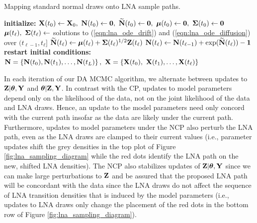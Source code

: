 \begin{algorithm}[htbp]
	\caption{Mapping standard normal draws onto LNA sample paths.}
	\label{alg:doLNA}
	\begin{algorithmic}[1]
		\State \textbf{initialize: }$ \bX(t_0) \gets \bX_0,\ \bN(t_0) \gets \bs{0},\ \bNtil(t_0) \gets \bs{0},\ \bmu(t_0) \gets \bs{0},\ \bSigma(t_0) \gets \bs{0} $
		\State $ \boldsymbol{\mu}(t_\ell),\ \boldsymbol{\Sigma}(t_\ell) \gets $ solutions to (\ref{eqn:lna_ode_drift}) and (\ref{eqn:lna_ode_diffusion}) over $ (t_{\ell-1}, t_\ell] $
		\State $ \widetilde{\mathbf{N}}(t_\ell)\gets \boldsymbol{\mu}(t_\ell) + \boldsymbol{\Sigma}(t_\ell)^{1/2}\mathbf{Z}(t_\ell) $ 
		\State $ \mathbf{N}(t_\ell)\gets \mathbf{N}(t_{\ell-1}) + \exp(\widetilde{\mathbf{N}}(t_\ell)) - \boldsymbol{1} $
		\State \textbf{restart initial conditions:} 
		\EndFor
		\State \hspace{-0.25in}\Return {}
		\State$\mathbf{N} = \left \lbrace\mathbf{N}(t_0),\mathbf{N}(t_1),\dots,\mathbf{N}(t_L)\right \rbrace,\ \mathbf{X} = \left \lbrace \mathbf{X}(t_0),\ \mathbf{X}(t_1),\dots,\mathbf{X}(t_\ell) \right \rbrace $
		\EndProcedure
	\end{algorithmic}
\end{algorithm}

In each iteration of our DA MCMC algorithm, we alternate between updates to $ \mathbf{Z}|\boldsymbol{\theta},\mathbf{Y} $ and $ \boldsymbol{\theta}|\mathbf{Z},\mathbf{Y} $.  In contrast with the CP, updates to model parameters depend only on the likelihood of the data, not on the joint likelihood of the data and LNA draws. Hence, an update to the model parameters need only concord with the current path insofar as the data are likely under the current path. Furthermore, updates to model parameters under the NCP also perturb the LNA path, even as the LNA draws are clamped to their current values (i.e., parameter updates shift the grey densities in the top plot of Figure \ref{fig:lna_sampling_diagram} while the red dots identify the LNA path on the new, shifted LNA densities). The NCP also stabilizes updates of $ \mathbf{Z}|\boldsymbol{\theta},\mathbf{Y} $ since we can make large perturbations to $ \mathbf{Z} $ and be assured that the proposed LNA path will be concordant with the data since the LNA draws do not affect the sequence of LNA transition densities that is induced by the model parameters (i.e., updates to LNA draws only change the placement of the red dots in the bottom row of Figure \ref{fig:lna_sampling_diagram}).  

